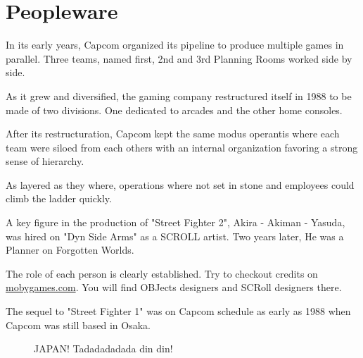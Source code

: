 \chapter{Peopleware} 

In its early years, Capcom organized its pipeline to produce multiple games in parallel. Three teams, named first, 2nd and 3rd Planning Rooms worked side by side. 

As it grew and diversified, the gaming company restructured itself in 1988 to be made of two divisions. One dedicated to arcades and the other home consoles. 

After its restructuration, Capcom kept the same modus operantis where each team were siloed from each others with an internal organization favoring a strong sense of hierarchy. 



As layered as they where, operations where not set in stone and employees could climb the ladder quickly. 

A key figure in the production of "Street Fighter 2", Akira - Akiman - Yasuda, was hired on "Dyn Side Arms" as a SCROLL artist. Two years later, He was a Planner on Forgotten Worlds.

\begin{trivia}
The role of each person is clearly established. Try to checkout credits on \url{mobygames.com}. You will find OBJects designers and SCRoll designers there.
\end{trivia}

The sequel to "Street Fighter 1" was on Capcom schedule as early as 1988 when Capcom was still based in Osaka.

\begin{figure}[H]
\caption*{JAPAN! Tadadadadada din din!}
\end{figure}








